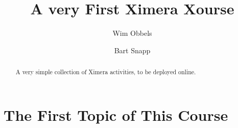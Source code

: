 \documentclass{xourse}
\author{Wim Obbels \and Bart Snapp}
\title{A very First Ximera Xourse}
\begin{document}
\begin{abstract}
    A very simple collection of Ximera activities, 
    to be deployed online.
\end{abstract}
\maketitle

\part{The First Topic of This Course}

    \chapterstyle
    \sectionstyle

    \chapterstyle
\end{document}

